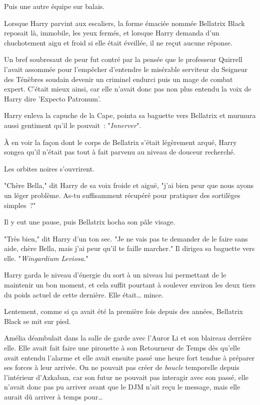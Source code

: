 Puis une autre équipe sur balais.

\later

Lorsque Harry parvint aux escaliers, la forme émaciée nommée Bellatrix Black reposait là, immobile, les yeux fermés, et lorsque Harry demanda d'un chuchotement aigu et froid si elle était éveillée, il ne reçut aucune réponse.

Un bref soubresaut de peur fut contré par la pensée que le professeur Quirrell l'avait assommée pour l'empêcher d'entendre le misérable serviteur du Seigneur des Ténèbres soudain devenir un criminel endurci puis un mage de combat expert. C'était mieux ainsi, car elle n'avait donc pas non plus entendu la voix de Harry dire 'Expecto Patronum'.

Harry enleva la capuche de la Cape, pointa sa baguette vers Bellatrix et murmura aussi gentiment qu'il le pouvait~: "\emph{Innerver}".

À en voir la façon dont le corps de Bellatrix s'était légèrement arqué, Harry songea qu'il n'était pas tout à fait parvenu au niveau de douceur recherché.

Les orbites noires s'ouvrirent.

"Chère Bella," dit Harry de sa voix froide et aiguë, "j'ai bien peur que nous ayons un léger problème. As-tu suffisamment récupéré pour pratiquer des sortilèges simples~?"

Il y eut une pause, puis Bellatrix hocha son pâle visage.

"Très bien," dit Harry d'un ton sec. "Je ne vais pas te demander de le faire sans aide, chère Bella, mais j'ai peur qu'il te faille marcher." Il dirigea sa baguette vers elle. "\emph{Wingardium Leviosa}."

Harry garda le niveau d'énergie du sort à un niveau lui permettant de le maintenir un bon moment, et cela suffit pourtant à soulever environ les deux tiers du poids actuel de cette dernière. Elle était… mince.

Lentement, comme si ça avait été la première fois depuis des années, Bellatrix Black se mit sur pied.

\later

Amélia déambulait dans la salle de garde avec l'Auror Li et son blaireau derrière elle. Elle avait fait faire une pirouette à son Retourneur de Temps dès qu'elle avait entendu l'alarme et elle avait ensuite passé une heure fort tendue à préparer ses forces à leur arrivée. On ne pouvait pas créer de \emph{boucle} temporelle depuis l'intérieur d'Azkaban, car son futur ne pouvait pas interagir avec son passé, elle n'avait donc pas pu arriver avant que le DJM n'ait reçu le message, mais elle aurait dû arriver à temps pour…

